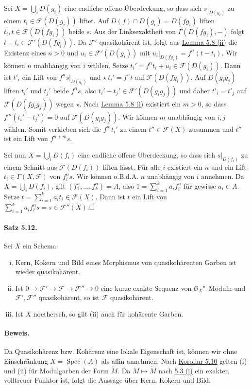 \documentclass[11pt,b5paper,openany]{memoir}
\def \qed {$\hfill\square$}
\begin{document}
Sei $X=\bigcup_i D(g_i)$ eine endliche offene Überdeckung, so dass sich $s|_{D(g_i)}$ zu einem $t_i\in\mathcal{F}(D(g_i))$ liftet. Auf $D(f)\cap D(g_i)=D(fg_i)$ liften $t_i,t\in\mathcal{F}(D(fg_i))$ beide $s$. Aus der Linksexaktheit von $\Gamma(D(fg_i), -)$ folgt $t-t_i\in\mathcal{F}'(D(fg_i))$. Da $\mathcal{F}'$ quasikohärent ist, folgt aus \hyperref[5.8]{Lemma 5.8 (ii)} die Existenz eines $n>0$ und $u_i\in\mathcal{F}'(D(g_i))$ mit $u_i|_{D(fg_i)}=f^n(t-t_i)$. Wir können $n$ unabhängig von $i$ wählen. Setze $t_i'=f^nt_i+u_i\in\mathcal{F}(D(g_i))$. Dann ist $t'_i$ ein Lift von $f^ns|_{D(g_i)}$ und $\star\ t_i'=f^nt$ auf $\mathcal{F}(D(fg_i))$. Auf $D(g_ig_j)$ liften $t_i'$ und $t_j'$ beide $f^ns$, also $t_i'-t_j'\in\mathcal{F}'(D(g_ig_j))$ und daher $t'_i=t'_j$ auf $\mathcal{F}(D(fg_ig_j))$ wegen $\star$. Nach \hyperref[5.8]{Lemma 5.8 (i)} existiert ein $m>0$, so dass $f^m(t_i'-t_j')=0$ auf $\mathcal{F}(D(g_ig_j))$. Wir können $m$ unabhängig von $i,j$ wählen. Somit verkleben sich die $f^mt_i'$ zu einem $t''\in\mathcal{F}(X)$ zusammen und $t''$ ist ein Lift von $f^{n+m}s$.

Sei nun $X=\bigcup_i D(f_i)$ eine endliche offene Überdeckung, so dass sich $s|_{D(f_i)}$  zu einem Schnitt aus $\mathcal{F}(D(f_i))$ liften lässt. Für alle $i$ existiert ein $n$ und ein Lift $t_i\in\Gamma(X,\mathcal{F})$ von $f_i^ns$. Wir können o.B.d.A. $n$ unabhängig von $i$ annehmen. Da $X=\bigcup_i D(f_i)$, gilt $(f_1^n,\ldots,f_k^n)=A$, also $1=\sum_{i=1}^k a_if_i^n$ für gewisse $a_i\in A$. Setze $t=\sum_{i=1}^k a_it_i\in\mathcal{F}(X)$. Dann ist $t$ ein Lift von $\sum_{i=1}^k a_if_i^ns=s\in\mathcal{F}''(X)$.\qed

\paragraph{Satz 5.12.}\label{5.12} Sei $X$ ein Schema.
\begin{enumerate}[(i)]
\item Kern, Kokern und Bild eines Morphismus von quasikohärenten Garben ist wieder quasikohärent.
\item Ist $0\to\mathcal{F}'\to\mathcal{F}\to\mathcal{F}''\to 0$ eine kurze exakte Sequenz von $\mathcal{O}_X$"~Moduln und $\mathcal{F}',\mathcal{F}''$ quasikohärent, so ist $\mathcal{F}$ quasikohärent.
\item Ist $X$ noethersch, so gilt (ii) auch für kohärente Garben.
\end{enumerate}

\paragraph{Beweis.} Da Quasikohärenz bzw. Kohärenz eine lokale Eigenschaft ist, können wir ohne Einschränkung $X=\operatorname{Spec}(A)$ als affin annehmen. Nach \hyperref[5.10]{Korollar 5.10} gelten (i) und (ii) für Modulgarben der Form $\widetilde{M}$. Da $M\mapsto \widetilde{M}$ nach \hyperref[5.3]{5.3 (i)} ein exakter, volltreuer Funktor ist, folgt die Aussage über Kern, Kokern und Bild.
\end{document}
